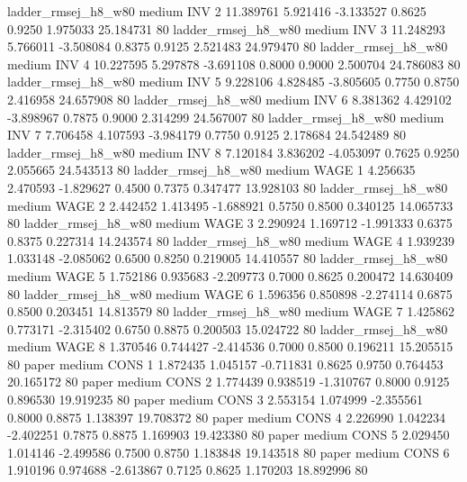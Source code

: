   ladder_rmsej_h8_w80     medium      INV                 2 11.389761 5.921416 -3.133527 0.8625 0.9250  1.975033   25.184731 80
   ladder_rmsej_h8_w80     medium      INV                 3 11.248293 5.766011 -3.508084 0.8375 0.9125  2.521483   24.979470 80
   ladder_rmsej_h8_w80     medium      INV                 4 10.227595 5.297878 -3.691108 0.8000 0.9000  2.500704   24.786083 80
   ladder_rmsej_h8_w80     medium      INV                 5  9.228106 4.828485 -3.805605 0.7750 0.8750  2.416958   24.657908 80
   ladder_rmsej_h8_w80     medium      INV                 6  8.381362 4.429102 -3.898967 0.7875 0.9000  2.314299   24.567007 80
   ladder_rmsej_h8_w80     medium      INV                 7  7.706458 4.107593 -3.984179 0.7750 0.9125  2.178684   24.542489 80
   ladder_rmsej_h8_w80     medium      INV                 8  7.120184 3.836202 -4.053097 0.7625 0.9250  2.055665   24.543513 80
   ladder_rmsej_h8_w80     medium     WAGE                 1  4.256635 2.470593 -1.829627 0.4500 0.7375  0.347477   13.928103 80
   ladder_rmsej_h8_w80     medium     WAGE                 2  2.442452 1.413495 -1.688921 0.5750 0.8500  0.340125   14.065733 80
   ladder_rmsej_h8_w80     medium     WAGE                 3  2.290924 1.169712 -1.991333 0.6375 0.8375  0.227314   14.243574 80
   ladder_rmsej_h8_w80     medium     WAGE                 4  1.939239 1.033148 -2.085062 0.6500 0.8250  0.219005   14.410557 80
   ladder_rmsej_h8_w80     medium     WAGE                 5  1.752186 0.935683 -2.209773 0.7000 0.8625  0.200472   14.630409 80
   ladder_rmsej_h8_w80     medium     WAGE                 6  1.596356 0.850898 -2.274114 0.6875 0.8500  0.203451   14.813579 80
   ladder_rmsej_h8_w80     medium     WAGE                 7  1.425862 0.773171 -2.315402 0.6750 0.8875  0.200503   15.024722 80
   ladder_rmsej_h8_w80     medium     WAGE                 8  1.370546 0.744427 -2.414536 0.7000 0.8500  0.196211   15.205515 80
                 paper     medium     CONS                 1  1.872435 1.045157 -0.711831 0.8625 0.9750  0.764453   20.165172 80
                 paper     medium     CONS                 2  1.774439 0.938519 -1.310767 0.8000 0.9125  0.896530   19.919235 80
                 paper     medium     CONS                 3  2.553154 1.074999 -2.355561 0.8000 0.8875  1.138397   19.708372 80
                 paper     medium     CONS                 4  2.226990 1.042234 -2.402251 0.7875 0.8875  1.169903   19.423380 80
                 paper     medium     CONS                 5  2.029450 1.014146 -2.499586 0.7500 0.8750  1.183848   19.143518 80
                 paper     medium     CONS                 6  1.910196 0.974688 -2.613867 0.7125 0.8625  1.170203   18.892996 80
